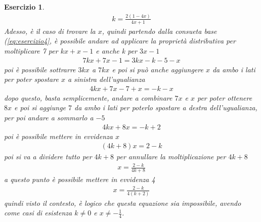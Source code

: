 \documentclass{book}
\newtheorem{es}[section]{Esercizio}
\begin{document}
\begin{es}
  \begin{eqnarray*}
    k=\frac{2(1-4x)}{4x+1}
  \end{eqnarray*}
  Adesso, è il caso di trovare la $x$, quindi partendo dalla consueta base (\ref{eq:esercizio4},
  è possibile andare ad applicare la proprietà distributiva per moltiplicare 7 per $kx+x-1$ e anche
  k per $3x-1$
  \begin{eqnarray*}
    7kx+7x-1=3kx-k-5-x
  \end{eqnarray*}
  poi è possibile sottrarre $3kx$ a $7kx$ e poi si può anche aggiungere $x$ da ambo i lati per poter
  spostare $x$ a sinistra dell'ugualianza
  \begin{eqnarray*}
    4kx+7x-7+x=-k-x
  \end{eqnarray*}
  dopo questo, basta semplicemente, andare a combinare $7x$ e $x$ per poter ottenere $8x$ e poi si
  aggiunge $7$ da ambo i lati per poterlo spostare a destra dell'ugualianza, per poi andare a sommarlo
  a $-5$
  \begin{eqnarray*}
    4kx+8x=-k+2
  \end{eqnarray*}
  poi è possibile mettere in evvidenza $x$
  \begin{eqnarray*}
    (4k+8)x=2-k
  \end{eqnarray*}
  poi si va a dividere tutto per $4k+8$ per annullare la moltiplicazione per $4k+8$
  \begin{eqnarray*}
    x=\frac{2-k}{4k+8}
  \end{eqnarray*}
  a questo punto è possibile mettere in evvidenza 4
  \begin{eqnarray*}
    x=\frac{2-k}{4(k+2)}
  \end{eqnarray*}
  quindi visto il contesto, è logico che questa equazione sia impossibile, avendo come casi di esistenza
  $k\neq 0$ e $x\neq -\frac{1}{4}$.
\end{es}
\end{document}
